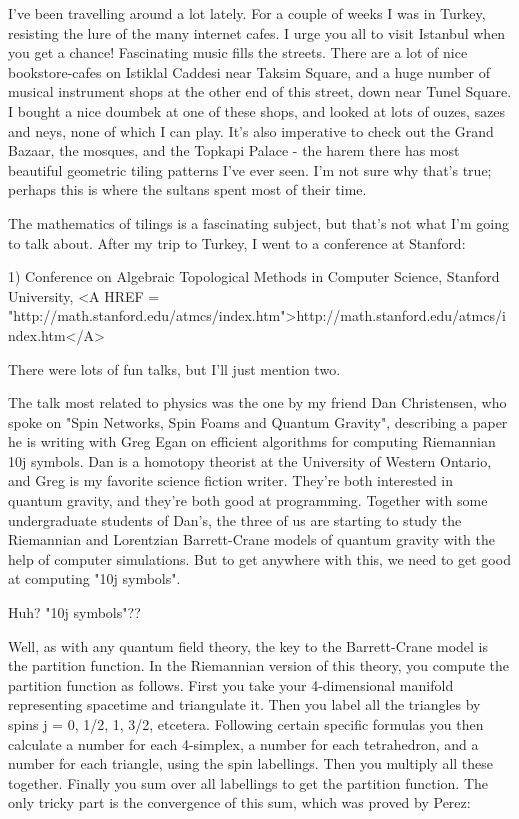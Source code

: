 


I've been travelling around a lot lately.  For a couple of weeks I was
in Turkey, resisting the lure of the many internet cafes.  I urge you
all to visit Istanbul when you get a chance!  Fascinating music fills
the streets.  There are a lot of nice bookstore-cafes on Istiklal
Caddesi near Taksim Square, and a huge number of musical instrument
shops at the other end of this street, down near Tunel Square.  I bought
a nice doumbek at one of these shops, and looked at lots of ouzes, sazes
and neys, none of which I can play.  It's also imperative to check out
the Grand Bazaar, the mosques, and the Topkapi Palace - the harem there
has most beautiful geometric tiling patterns I've ever seen.  I'm not
sure why that's true; perhaps this is where the sultans spent most of
their time.

The mathematics of tilings is a fascinating subject, but that's not what
I'm going to talk about.  After my trip to Turkey, I went to a conference 
at Stanford:

1) Conference on Algebraic Topological Methods in Computer Science,
Stanford University, 
<A HREF = "http://math.stanford.edu/atmcs/index.htm">http://math.stanford.edu/atmcs/index.htm</A>

There were lots of fun talks, but I'll just mention two.

The talk most related to physics was the one by my friend Dan Christensen, 
who spoke on "Spin Networks, Spin Foams and Quantum Gravity", describing 
a paper he is writing with Greg Egan on efficient algorithms for computing 
Riemannian 10j symbols.  Dan is a homotopy theorist at the University of 
Western Ontario, and Greg is my favorite science fiction writer.   They're 
both interested in quantum gravity, and they're both good at programming.  
Together with some undergraduate students of Dan's, the three of us are 
starting to study the Riemannian and Lorentzian Barrett-Crane models of 
quantum gravity with the help of computer simulations.  But to get anywhere 
with this, we need to get good at computing "10j symbols".  

Huh?  "10j symbols"??

Well, as with any quantum field theory, the key to the Barrett-Crane model 
is the partition function.  In the Riemannian version of this theory, you 
compute the partition function as follows.  First you take your 4-dimensional 
manifold representing spacetime and triangulate it.   Then you label all the 
triangles by spins j = 0, 1/2, 1, 3/2, etcetera.  Following certain specific 
formulas you then calculate a number for each 4-simplex, a number for each 
tetrahedron, and a number for each triangle, using the spin labellings.  Then 
you multiply all these together.   Finally you sum over all labellings to 
get the partition function.   The only tricky part is the convergence of 
this sum, which was proved by Perez:

